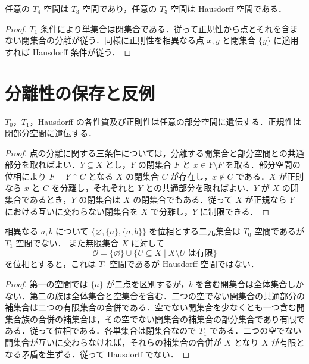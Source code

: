 \begin{prop}[T3・T4とHausdorff性]
任意の $T_4$ 空間は $T_3$ 空間であり，任意の $T_3$ 空間は Hausdorff 空間である．
\end{prop}
\begin{proof}
$T_1$ 条件により単集合は閉集合である．従って正規性から点とそれを含まない閉集合の分離が従う．同様に正則性を相異なる点 $x,y$ と閉集合 $\{y\}$ に適用すれば Hausdorff 条件が従う．
\end{proof}
\section{分離性の保存と反例}
\begin{prop}[部分空間の分離性]
$T_0$，$T_1$，Hausdorff の各性質及び正則性は任意の部分空間に遺伝する．正規性は閉部分空間に遺伝する．
\end{prop}
\begin{proof}
点の分離に関する三条件については，分離する開集合と部分空間との共通部分を取ればよい．$Y\subseteq X$ とし，$Y$ の閉集合 $F$ と $x\in Y\setminus F$ を取る．部分空間の位相により $F=Y\cap C$ となる $X$ の閉集合 $C$ が存在し，$x\notin C$ である．$X$ が正則なら $x$ と $C$ を分離し，それぞれと $Y$ との共通部分を取ればよい．$Y$ が $X$ の閉集合であるとき，$Y$ の閉集合は $X$ の閉集合でもある．従って $X$ が正規なら $Y$ における互いに交わらない閉集合を $X$ で分離し，$Y$ に制限できる．
\end{proof}
\begin{prop}[分離公理の逆が成り立たない例]
相異なる $a,b$ について $\{\varnothing,\{a\},\{a,b\}\}$ を位相とする二元集合は $T_0$ 空間であるが $T_1$ 空間でない．
また無限集合 $X$ に対して
\[
 \mathcal O=\{\varnothing\}\cup\{U\subseteq X\mid X\setminus U\text{ は有限}\}
\]
を位相とすると，これは $T_1$ 空間であるが Hausdorff 空間ではない．
\end{prop}
\begin{proof}
第一の空間では $\{a\}$ が二点を区別するが，$b$ を含む開集合は全体集合しかない．第二の族は全体集合と空集合を含む．二つの空でない開集合の共通部分の補集合は二つの有限集合の合併である．空でない開集合を少なくとも一つ含む開集合族の合併の補集合は，その空でない開集合の補集合の部分集合であり有限である．従って位相である．各単集合は閉集合なので $T_1$ である．二つの空でない開集合が互いに交わらなければ，それらの補集合の合併が $X$ となり $X$ が有限となる矛盾を生ずる．従って Hausdorff でない．
\end{proof}

